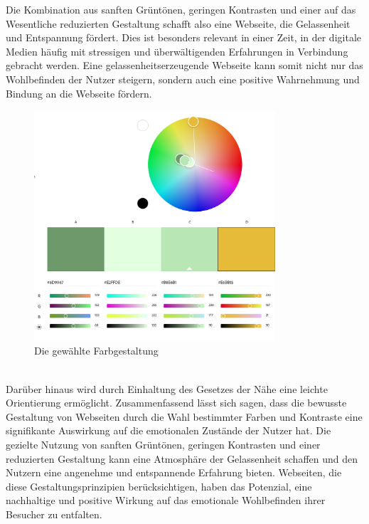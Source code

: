 \documentclass[./dokumentation.tex]{subfiles}
\begin{document}
Die Kombination aus sanften Grüntönen, geringen Kontrasten und einer auf das Wesentliche reduzierten Gestaltung schafft also eine Webseite, die Gelassenheit und Entspannung fördert. Dies ist besonders relevant in einer Zeit, in der digitale Medien häufig mit stressigen und überwältigenden Erfahrungen in Verbindung gebracht werden. Eine gelassenheitserzeugende Webseite kann somit nicht nur das Wohlbefinden der Nutzer steigern, sondern auch eine positive Wahrnehmung und Bindung an die Webseite fördern.\\


\begin{figure}[h]
    \centering
    \includegraphics[width=0.8\textwidth]{bilder/adobecolor.png}
    \caption{Die gewählte Farbgestaltung}
    \label{fig22:adobecolor}
\end{figure}\\

Darüber hinaus wird durch Einhaltung des Gesetzes der Nähe eine leichte Orientierung ermöglicht.  Zusammenfassend lässt sich sagen, dass die bewusste Gestaltung von Webseiten durch die Wahl bestimmter Farben und Kontraste eine signifikante Auswirkung auf die emotionalen Zustände der Nutzer hat. Die gezielte Nutzung von sanften Grüntönen, geringen Kontrasten und einer reduzierten Gestaltung kann eine Atmosphäre der Gelassenheit schaffen und den Nutzern eine angenehme und entspannende Erfahrung bieten. Webseiten, die diese Gestaltungsprinzipien berücksichtigen, haben das Potenzial, eine nachhaltige und positive Wirkung auf das emotionale Wohlbefinden ihrer Besucher zu entfalten.\\
\end{document}
